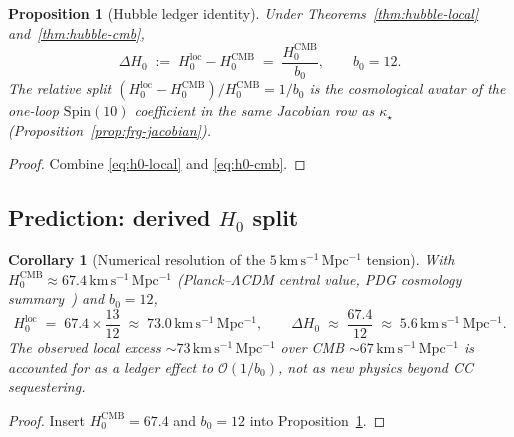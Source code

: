 \documentclass[aps,prd,onecolumn,amsmath,amssymb,nofootinbib,11pt]{revtex4-2}
\numberwithin{equation}{section}
\theoremstyle{plain}
\newtheorem{proposition}[theorem]{Proposition}
\newtheorem{corollary}[theorem]{Corollary}
\theoremstyle{definition}
\theoremstyle{remark}
\newcommand{\Spin}{\mathrm{Spin}}
\begin{document}
\begin{proposition}[Hubble ledger identity]
\label{prop:h0-ledger}
Under Theorems~\ref{thm:hubble-local} and~\ref{thm:hubble-cmb},
\begin{equation}\label{eq:h0-ledger}
  \Delta H_0
  \;:=\;
  H_0^{\mathrm{loc}}-H_0^{\mathrm{CMB}}
  \;=\;
  \frac{H_0^{\mathrm{CMB}}}{b_0},
  \qquad
  b_0=12.
\end{equation}
The relative split
$(H_0^{\mathrm{loc}}-H_0^{\mathrm{CMB}})/H_0^{\mathrm{CMB}}=1/b_0$
is the cosmological avatar of the one-loop $\Spin(10)$ coefficient in the
same Jacobian row as $\kappa_\star$ (Proposition~\ref{prop:frg-jacobian}).
\end{proposition}

\begin{proof}
Combine \eqref{eq:h0-local} and \eqref{eq:h0-cmb}.
\end{proof}

\subsection{Prediction: derived $H_0$ split}
\label{sec:cosmology:h0-prediction}

\begin{corollary}[Numerical resolution of the $5\,\mathrm{km\,s^{-1}\,Mpc^{-1}}$
tension]\label{cor:h0-numeric}
With $H_0^{\mathrm{CMB}}\approx 67.4\,\mathrm{km\,s^{-1}\,Mpc^{-1}}$
(Planck--$\Lambda$CDM central value, PDG cosmology summary~\cite{PDG2025})
and $b_0=12$,
\begin{equation}\label{eq:h0-numeric}
  H_0^{\mathrm{loc}}
  \;=\;
  67.4\times\frac{13}{12}
  \;\approx\;
  73.0\,\mathrm{km\,s^{-1}\,Mpc^{-1}},
  \qquad
  \Delta H_0
  \;\approx\;
  \frac{67.4}{12}
  \;\approx\;
  5.6\,\mathrm{km\,s^{-1}\,Mpc^{-1}}.
\end{equation}
The observed local excess $\sim 73\,\mathrm{km\,s^{-1}\,Mpc^{-1}}$ over CMB
$\sim 67\,\mathrm{km\,s^{-1}\,Mpc^{-1}}$ is accounted for as a ledger effect
to $\mathcal{O}(1/b_0)$, not as new physics beyond CC sequestering.
\end{corollary}

\begin{proof}
Insert $H_0^{\mathrm{CMB}}=67.4$ and $b_0=12$ into
Proposition~\ref{prop:h0-ledger}.
\end{proof}
\end{document}
